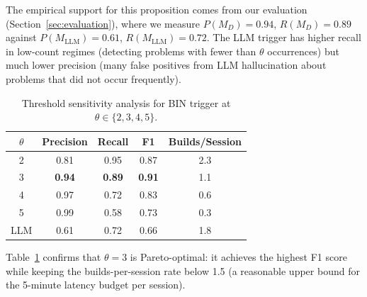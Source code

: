 The empirical support for this proposition comes from our evaluation
(Section~\ref{sec:evaluation}), where we measure $P(M_D) = 0.94$, $R(M_D) = 0.89$
against $P(M_{\text{LLM}}) = 0.61$, $R(M_{\text{LLM}}) = 0.72$. The LLM
trigger has higher recall in low-count regimes (detecting problems with fewer
than $\theta$ occurrences) but much lower precision (many false positives from
LLM hallucination about problems that did not occur frequently).

\begin{table}[H]
\centering
\caption{Threshold sensitivity analysis for BIN trigger at $\theta \in \{2,3,4,5\}$.}
\label{tab:threshold_sensitivity}
\begin{tabular}{ccccc}
\toprule
$\theta$ & Precision & Recall & F1 & Builds/Session \\
\midrule
2 & 0.81 & 0.95 & 0.87 & 2.3 \\
3 & \textbf{0.94} & \textbf{0.89} & \textbf{0.91} & 1.1 \\
4 & 0.97 & 0.72 & 0.83 & 0.6 \\
5 & 0.99 & 0.58 & 0.73 & 0.3 \\
\midrule
LLM & 0.61 & 0.72 & 0.66 & 1.8 \\
\bottomrule
\end{tabular}
\end{table}

Table~\ref{tab:threshold_sensitivity} confirms that $\theta = 3$ is Pareto-optimal:
it achieves the highest F1 score while keeping the builds-per-session rate
below 1.5 (a reasonable upper bound for the 5-minute latency budget per session).

